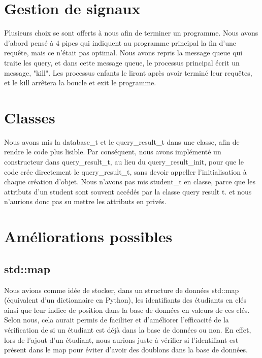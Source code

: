 \documentclass[utf8]{article}
\begin{document}
\section{Gestion de signaux}
\indent{}
\par
Plusieurs choix se sont offerts à nous afin de terminer un programme. Nous avons d'abord pensé à 4 pipes qui indiquent au programme principal 
la fin d'une requête, mais ce n'était pas optimal.
Nous avons repris la message queue qui traite les query, et dans 
cette message queue, le processus principal écrit un message, "kill". Les processus enfants le liront après avoir terminé leur requêtes,
et le kill arrêtera la boucle et exit le programme.


\section{Classes}
\indent{}
\par
Nous avons mis la database\_t et le query\_result\_t dans une classe, afin de rendre le code plus lisible. Par conséquent,
nous avons implémenté un constructeur dans query\_result\_t, au lieu du query\_result\_init, pour que le code
crée directement le query\_result\_t, sans devoir appeller l'initialisation à chaque création d'objet.
Nous n'avons pas mis student\_t en classe, parce que les attributs d'un student sont souvent accédés par la classe query result t.
et nous n'aurions donc pas su mettre les attributs en privés.

\section{Améliorations possibles}
    \subsection{std::map}
    \indent{}
\par
    Nous avions comme idée de stocker, dans un structure de données std::map (équivalent d'un dictionnaire en Python), les identifiants des étudiants en clés ainsi que leur indice de position dans la base de données en valeurs de ces clés. \newline
    Selon nous, cela aurait permis de faciliter et d'améliorer l'efficacité de la vérification de si un étudiant est déjà dans la base de données ou non. \newline En effet, lors de l'ajout d'un étudiant, nous aurions juste à vérifier si l'identifiant est présent dans le map pour éviter d'avoir des doublons dans la base de données.
\end{document}
